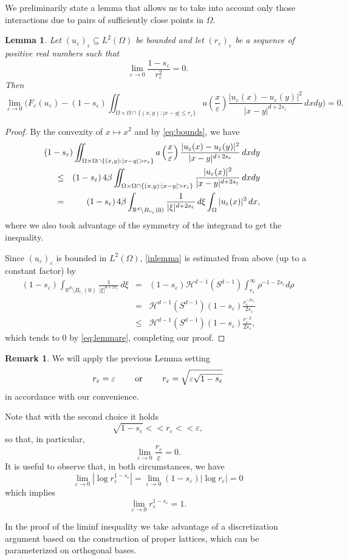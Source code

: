 \documentclass[11pt,a4paper,reqno]{amsart}
\theoremstyle{plain}
\newtheorem{lemma}[theorem]{Lemma}
\theoremstyle{definition}
\newtheorem{remark}[theorem]{Remark}
\newcommand\e{\varepsilon}
\newcommand\R{\mathbb{R}}    %
\newcommand\be{\begin{equation}}
\newcommand\ee{\end{equation}}
\theoremstyle{remark}
\begin{document}
We preliminarily state a lemma that allows us to take into account only those interactions due to pairs of sufficiently close points in $\Omega$.


\begin{lemma}\label{lemma:locality} Let $(u_\e)_\e\subseteq L^2(\Omega)$ be bounded and let $(r_\e)_\e$ be a sequence of positive real numbers such that
\be\label{eq:lemmare}
\lim_{\e\to0}\frac{1-s_\e}{r_\e^2}=0.
\ee
Then 
\[
\lim_{\e\to0} \biggl(F_{\e}(u_\e)-(1-s_\e) \iint_{\Omega\times \Omega \cap \{(x,y) : |x-y|\leq r_\e\}}a\left(\frac{x}{\e}\right)\frac{|u_\e(x)-u_\e(y)|^2}{|x-y|^{d+2s_\e}}\,dxdy\biggr)=0 .
\]
\end{lemma}

\begin{proof}
 By the convexity of $x\mapsto x^2$ and by \eqref{eq:bounds}, we have
\begin{eqnarray} \label{inlemma} && \nonumber
\hskip-2cm(1-s_\e)\iint_{\Omega\times \Omega \cap \{(x,y) : |x-y| > r_\e\}}a\left(\frac{x}{\e}\right)\frac{|u_\e(x)-u_\e(y)|^2}{|x-y|^{d+2s_\e}}\,dxdy  \\ \nonumber
&\leq& (1-s_\e)\, 4 \beta \iint_{\Omega\times \Omega \cap \{(x,y) : |x-y| > r_\e\}}\frac{|u_\e(x)|^2}{|x-y|^{d+2s_\e}}\,dxdy    \\ 
&=& (1-s_\e)\, 4 \beta \int_{\R^d\setminus B_{r_\e}(0)}\frac{1}{|\xi|^{d+2s_\e}}\,d\xi\int_\Omega|u_\e(x)|^2\,dx,
\end{eqnarray}
where we also took advantage of the symmetry of the integrand to get the inequality.

Since $(u_\e)_\e$ is bounded in $L^2(\Omega)$, \eqref{inlemma} is estimated from above (up to a constant factor) by
\begin{eqnarray*}
    (1-s_\e)\int_{\R^d\setminus B_{r_\e}(0)}\frac{1}{|\xi|^{d+2s_\e}}\,d\xi& = &(1-s_\e)\mathcal{H}^{d-1}(S^{d-1})\int_{r_\e}^{\infty}\rho^{-1-2s_\e}d\rho\\
    &=& \mathcal{H}^{d-1}(S^{d-1})(1-s_\e)\frac{r_\e^{-2s_\e}}{2s_\e}\\
    &\leq& \mathcal{H}^{d-1}(S^{d-1})(1-s_\e)\frac{r_\e^{-2}}{2s_\e},
\end{eqnarray*}
which tends to $0$ by \eqref{eq:lemmare}, completing our proof.
\end{proof}

\begin{remark}\label{re:remark} We will apply the previous Lemma setting
\[
r_\e= \e \qquad \hbox{ or } \qquad r_\e=\sqrt{\e\sqrt{1-s_\e}}
\]
in accordance with our convenience.

Note that with the second choice it holds
$$\sqrt{1-s_\e}<\!<r_\e<\!<\e,$$
so that, in particular,
\begin{equation}\label{eq:ratio}
\lim_{\e\to0}\frac{r_\e}{\e}=0.
    \end{equation}
It is useful to observe that, in both circumstances, we have
\[
\lim_{\e\to0}|\log r_\e^{1-s_\e}| = \lim_{\e\to0}(1-s_\e)|\log r_\e|=0
\]
which implies
\be\label{eq:power}
\lim_{\e\to0} r_\e^{1-s_\e}=1.
\ee
\end{remark}
In the proof of the liminf inequality we take advantage of a discretization argument based on the construction of proper lattices, which can be parameterized on orthogonal bases.
\end{document}
